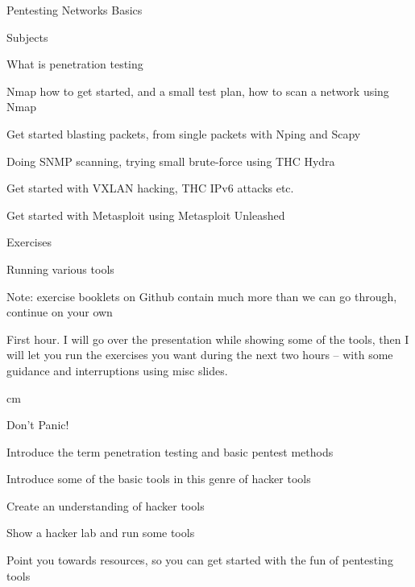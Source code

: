\documentclass[Screen16to9,17pt]{foils}
\begin{document}
{}

\mytitlepage
{Pentesting Networks Basics}

\LogoOn



\begin{list1}
\item Subjects
\begin{list2}
\item What is penetration testing
\item Nmap how to get started, and a small test plan, how to scan a network using Nmap
\item Get started blasting packets, from single packets with Nping and Scapy
\item Doing SNMP scanning, trying small brute-force using THC Hydra
\item Get started with VXLAN hacking, THC IPv6 attacks etc.
\item Get started with Metasploit using Metasploit Unleashed
\end{list2}
\item Exercises
\begin{list2}
\item Running various tools
\item Note: exercise booklets on Github contain much more than we can go through, continue on your own
\end{list2}
\end{list1}

First hour.  I will go over the presentation while showing some of the tools, then I will let you run the exercises you want during the next two hours -- with some guidance and interruptions using misc slides.



 cm

\centerline{\color{titlecolor}\LARGE Don't Panic!}


\begin{list1}
\item Introduce the term penetration testing and basic pentest methods
\item Introduce some of the basic tools in this genre of hacker tools
\item Create an understanding of hacker tools
\item Show a hacker lab and run some tools
\item Point you towards resources, so you can get started with the fun of pentesting tools
\end{list1}
\end{document}
